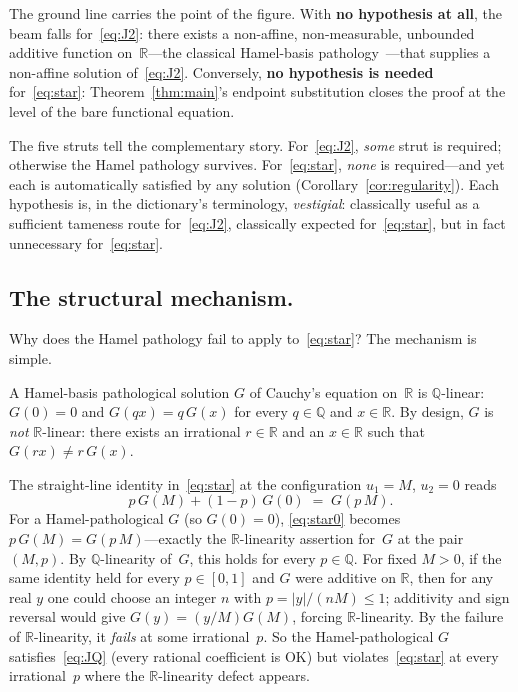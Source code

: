 \documentclass{article}
\theoremstyle{plain}
\theoremstyle{definition}
\newcommand{\R}{\mathbb{R}}
\newcommand{\Q}{\mathbb{Q}}
\begin{document}
The ground line carries the point of the figure. With \textbf{no
hypothesis at all}, the beam falls for~\eqref{eq:J2}: there exists a
non-affine, non-measurable, unbounded additive function
on~$\R$---the classical Hamel-basis pathology~\cite{Hamel1905}---that
supplies a non-affine solution of~\eqref{eq:J2}. Conversely,
\textbf{no hypothesis is needed} for~\eqref{eq:star}:
Theorem~\ref{thm:main}'s endpoint substitution closes the proof at
the level of the bare functional equation.

The five struts tell the complementary story. For~\eqref{eq:J2},
\emph{some} strut is required; otherwise the Hamel pathology
survives. For~\eqref{eq:star}, \emph{none} is required---and yet each
is automatically satisfied by any solution
(Corollary~\ref{cor:regularity}). Each hypothesis is, in the
dictionary's terminology, \emph{vestigial}: classically useful as a sufficient tameness route for~\eqref{eq:J2}, classically expected for~\eqref{eq:star}, but in
fact unnecessary for~\eqref{eq:star}.

\subsection{The structural mechanism.}
\label{ssec:mechanism}

Why does the Hamel pathology fail to apply to~\eqref{eq:star}? The
mechanism is simple.

A Hamel-basis pathological solution $G$ of Cauchy's equation on~$\R$ is
$\Q$-linear: $G(0)=0$ and $G(qx)=q\,G(x)$ for every $q\in\Q$ and
$x\in\R$. By design, $G$ is \emph{not} $\R$-linear: there exists an
irrational $r\in\R$ and an $x\in\R$ such that $G(rx)\ne r\,G(x)$.

The straight-line identity in~\eqref{eq:star} at the configuration $u_1=M$,
$u_2=0$ reads
\begin{equation}
p\,G(M)+(1-p)\,G(0) \;=\; G(p\,M).
\tag{$\star_0$}\label{eq:star0}
\end{equation}
For a Hamel-pathological $G$ (so $G(0)=0$), \eqref{eq:star0} becomes
$p\,G(M)=G(p\,M)$---exactly the $\R$-linearity assertion for~$G$ at the
pair $(M,p)$. By $\Q$-linearity of~$G$, this holds for every $p\in\Q$.
For fixed $M>0$, if the same identity held for every $p\in[0,1]$ and $G$ were additive on $\R$, then for any real $y$ one could choose an integer $n$ with $p=|y|/(nM)\le1$; additivity and sign reversal would give $G(y)=(y/M)G(M)$, forcing $\R$-linearity.
By the failure of $\R$-linearity, it \emph{fails} at some irrational~$p$.
So the Hamel-pathological $G$ satisfies~\eqref{eq:JQ} (every rational
coefficient is OK) but violates~\eqref{eq:star} at every irrational~$p$
where the $\R$-linearity defect appears.
\end{document}
